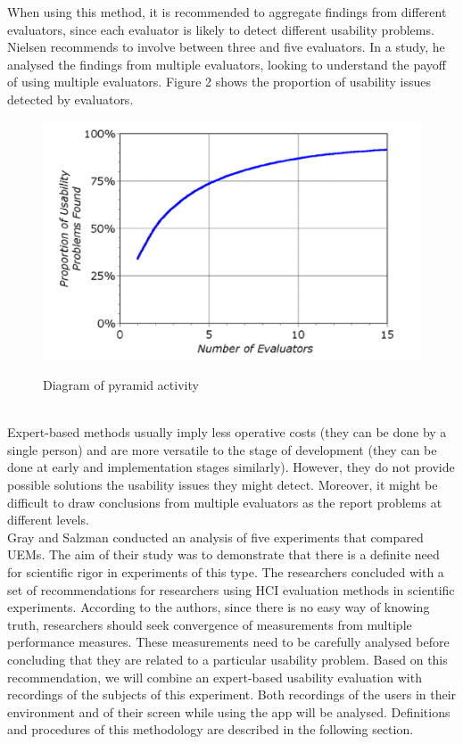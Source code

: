 When using this method, it is recommended to aggregate findings from different evaluators, since each evaluator is likely to detect different usability problems. Nielsen \cite{Nielsen1994-un} recommends to involve between three and five evaluators. In a study, he analysed the findings from multiple evaluators, looking to understand the payoff of using multiple evaluators. Figure 2 shows the proportion of usability issues detected by evaluators.
\begin{figure}[!h]
    \includegraphics[clip,width=\columnwidth]{Figures/evaluators.png}%
\caption{Diagram of pyramid activity}
\label{fig:timeseries}
\cite{Nielsen_undated-po}
\end{figure}\\
Expert-based methods usually imply less operative costs (they can be done by a single person) and are more versatile to the stage of development (they can be done at early and implementation stages similarly).  However, they do not provide possible solutions the usability issues they might  detect. Moreover, it might be difficult to draw conclusions from multiple evaluators as the report problems at different levels.\\
Gray and Salzman \cite{Gray1998-oo} conducted an analysis of five experiments that compared UEMs. The aim of their study was to demonstrate that there is a definite need for scientific rigor in experiments of this type. The researchers concluded with a set of recommendations for researchers using HCI evaluation methods in scientific experiments. According to the authors, since there is no easy way of knowing truth, researchers should seek convergence of measurements from multiple performance measures. These measurements need to be carefully analysed before concluding that they are related to a particular usability problem. Based on this recommendation, we will combine an expert-based usability evaluation with recordings of the subjects of this experiment. Both recordings of the users in their environment and of their screen while using the app will be analysed. Definitions and procedures of this methodology are described in the following section.
